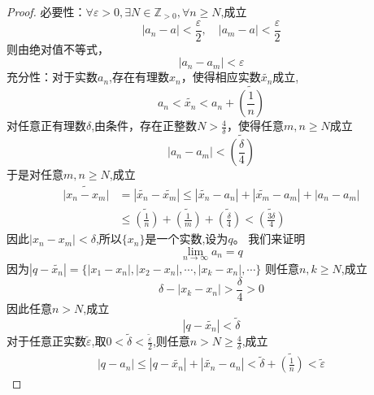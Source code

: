 \documentclass[12pt, a4paper, oneside]{ctexart}
\newcommand{\ep}{\varepsilon}
\newcommand{\bol}{\widetilde}
\begin{document}
\begin{proof}
    必要性：$\forall \ep>0,\exists N\in \mathbb{Z}_{>0},\forall n\ge N$,成立
    \begin{equation*}
        |a_{n}-a|<\frac{\ep}{2},\quad |a_{m}-a|<\frac{\ep}{2}
    \end{equation*}
    则由绝对值不等式，$$|a_{n}-a_{m}|<\ep$$
    充分性：对于实数$a_{n}$,存在有理数$x_{n}$，使得相应实数$\bol{x_{n}}$成立,
    \begin{equation*}
        a_{n}<\bol{x_{n}}<a_{n}+\bol{(\frac{1}{n})}
    \end{equation*}
    对任意正有理数$\delta$,由条件，存在正整数$N>\frac{4}{\delta}$，使得任意$m,n\ge N$成立
    \begin{equation*}
        |a_{n}-a_{m}|<\bol{(\frac{\delta}{4})}
    \end{equation*}
    于是对任意$m,n\ge N$,成立
    \begin{align*}
        \bol{|x_{n}- x_{m}|} & =| \bol{x_{n}} - \bol{x_{m} }|\le | \bol{x_{n}}-a_{n}|+| \bol{x_{m}}-a_{m}|+|a_{n}-a_{m}|        \\
                             & \le \bol{(\frac{1}{n})}+\bol{(\frac{1}{m})}+\bol{(\frac{\delta}{4})} < \bol{(\frac{3\delta}{4})}
    \end{align*}
    因此$|x_{n}-x_{m}|<\delta$,所以$\{ x_{n} \}$是一个实数,设为$q$。
    我们来证明$$\lim_{n \to \infty }a_{n}=q$$
    因为$|q-\bol{x_{n}}|=\{ |x_{1}-x_{n}|,|x_{2}-x_{n}|,\cdots,|x_{k}-x_{n}|,\cdots\}$
    则任意$n,k\ge N$,成立
    \begin{equation*}
        \delta-|x_{k}-x_{n}|>\frac{\delta}{4}>0
    \end{equation*}
    因此任意$n>N$,成立
    \begin{equation*}
        |q-\bol{x_{n}}|<\bol{\delta}
    \end{equation*}
    对于任意正实数$\bol{\ep}$,取$0<\bol{\delta}<\frac{\bol{\ep}}{2} $,则任意$n>N\ge \frac{4}{\delta}$,成立
    \begin{align*}
        |q-a_{n}|\le |q-\bol{x_{n}}|+|\bol{x_{n}}-a_{n}|<\bol{\delta}+\bol{(\frac{1}{n})}<\bol{\ep}
    \end{align*}
\end{proof}
\end{document}
